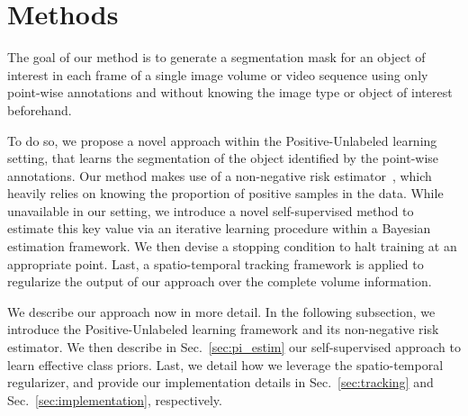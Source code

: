 \section{Methods}
\label{sec:methods}

The goal of our method is to generate a segmentation mask for an object of interest in each frame of a single image volume or video sequence using only point-wise annotations and without knowing the image type or object of interest beforehand.

To do so, we propose a novel approach within the Positive-Unlabeled learning setting, that learns the segmentation of the object identified by the point-wise annotations. Our method makes use of a non-negative risk estimator~\cite{kiryo17}, which heavily relies on knowing the proportion of positive samples in the data. While unavailable in our setting, we introduce a novel self-supervised method to estimate this key value via an iterative learning procedure within a Bayesian estimation framework. We then devise a stopping condition to halt training at an appropriate point. Last, a spatio-temporal tracking framework is applied to regularize the output of our approach over the complete volume information.

We describe our approach now in more detail. In the following subsection, we introduce the Positive-Unlabeled learning framework and its non-negative risk estimator. We then describe in 
Sec.~\ref{sec:pi_estim} our self-supervised approach to learn effective class priors. Last, we detail how we leverage the spatio-temporal regularizer, and provide our implementation details
in Sec.~\ref{sec:tracking} and Sec.~\ref{sec:implementation}, respectively.






